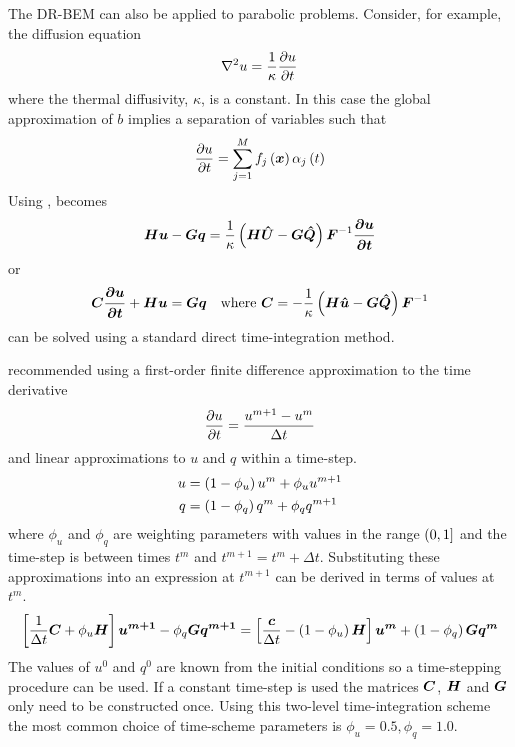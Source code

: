 The DR-BEM can also be applied to parabolic problems. Consider, 
for example, the diffusion equation
\begin{equation}
\nabla^{2} {u}  = \dfrac{1}{\kappa}  \dfrac{\partial u}{\partial t} 
\end{equation}
where the thermal diffusivity, $\kappa$, is a constant.  In this case the
global approximation of $b$ implies a separation of variables such that
\begin{equation}
\delby{u}{t} = \dsuml{j=1}{M} \fnof{f_{j}}{\vect{x}} \fnof{\alpha_{j}}{t}
\label{eq:sovapprox}
\end{equation}
Using ,  becomes
\begin{equation}
  \matr{H} \vect{u} - \matr{G} \vect{q} = \dfrac{1}{\kappa} \pbrac{\matr{H}
    \matr{\hat{U}} - \matr{G} \matr{\hat{Q}}} \matr{F}^{-1}
  \vect{\delby{u}{t}}
\end{equation}
or
\begin{equation}
  \matr{C} \vect{\delby{u}{t}} + \matr{H} \vect{u} = \matr{G}
  \vect{q}\quad\text{where }\matr{C} = -\dfrac{1}{\kappa}
  \pbrac{\matr{H} \vect{\hat{U}} - \matr{G} \matr{\hat{Q}}} \matr{F}^{-1}
\label{eq:drmtransient}
\end{equation}
 can be solved using a standard direct
time-integration method.

 recommended using a first-order finite difference
approximation to the time derivative 
\begin{equation}
 \dfrac{\partial u}{\partial t}  = \dfrac{u^{m+1} - u^{m}}{\Delta t}
\end{equation}
and linear approximations to $u$ and $q$ within a time-step.
\begin{align}
u & = \left( 1 - \phi_{u} \right) u^{m} + \phi_{u} u^{m+1} \\
q & = \left( 1 - \phi_{q} \right) q^{m} + \phi_{q} q^{m+1}
\end{align}
where $\phi_{u}$ and $\phi_{q}$ are weighting parameters with values in the
range $\left( 0,1 \right]$ and the time-step is between times $t^{m}$ and $t^{m+1} =
t^{m} + \Delta t$.  Substituting these approximations into
 an expression at $t^{m+1}$ can be derived in terms
of values at $t^{m}$.
\begin{equation}
  \sqbrac{\dfrac{1}{\Delta t} \matr{C} + \phi_{u} \matr{H}} \vect{u^{m+1}} -
  \phi_{q} \matr{G} \vect{q^{m+1}} = \sqbrac{\dfrac{\vect{C}}{\Delta t} -
    \pbrac{1-\phi_{u}} \matr{H}} \vect{u^{m}} + \pbrac{1 - \phi_{q}} \matr{G}
  \vect{q^{m}}
\end{equation}
The values of $u^{0}$ and $q^{0}$ are known from the initial conditions so
a time-stepping procedure can be used.  If a constant time-step is used the
matrices $\matr{C}$, $\matr{H}$ and $\matr{G}$ only need to be constructed
once.  Using this two-level time-integration scheme the most common choice
of time-scheme parameters is $\phi_{u} = 0.5, \phi_{q} = 1.0$.

